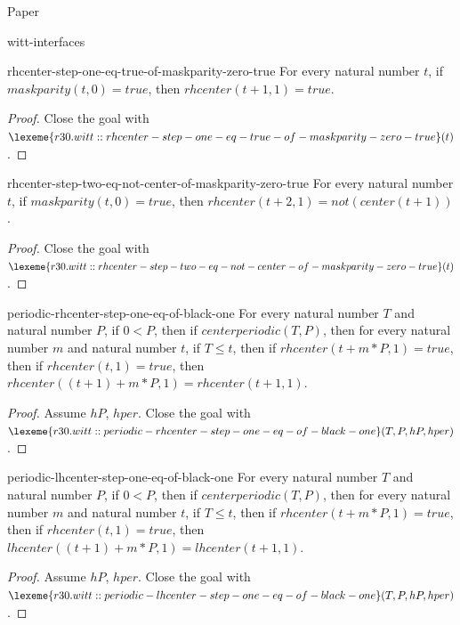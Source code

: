 \begin{lexlean}{Paper}
\begin{section}{witt-interfaces}
  \begin{theorem}{rhcenter-step-one-eq-true-of-maskparity-zero-true}
  For every natural number \(t\), if \(maskparity(t, 0) = true\), then \(rhcenter(t + 1, 1) = true\).
  \begin{proof}
  Close the goal with \(\lexeme{r30.witt::rhcenter-step-one-eq-true-of-maskparity-zero-true}(t)\).
  \end{proof}
  \end{theorem}

  \begin{theorem}{rhcenter-step-two-eq-not-center-of-maskparity-zero-true}
  For every natural number \(t\), if \(maskparity(t, 0) = true\), then \(rhcenter(t + 2, 1) = not(center(t + 1))\).
  \begin{proof}
  Close the goal with \(\lexeme{r30.witt::rhcenter-step-two-eq-not-center-of-maskparity-zero-true}(t)\).
  \end{proof}
  \end{theorem}

  \begin{theorem}{periodic-rhcenter-step-one-eq-of-black-one}
  For every natural number \(T\) and natural number \(P\), if \(0 < P\), then if \(centerperiodic(T, P)\), then for every natural number \(m\) and natural number \(t\), if \(T ≤ t\), then if \(rhcenter(t + m * P, 1) = true\), then if \(rhcenter(t, 1) = true\), then \(rhcenter((t + 1) + m * P, 1) = rhcenter(t + 1, 1)\).
  \begin{proof}
  Assume \(hP\), \(hper\).
  Close the goal with \(\lexeme{r30.witt::periodic-rhcenter-step-one-eq-of-black-one}(T, P, hP, hper)\).
  \end{proof}
  \end{theorem}

  \begin{theorem}{periodic-lhcenter-step-one-eq-of-black-one}
  For every natural number \(T\) and natural number \(P\), if \(0 < P\), then if \(centerperiodic(T, P)\), then for every natural number \(m\) and natural number \(t\), if \(T ≤ t\), then if \(rhcenter(t + m * P, 1) = true\), then if \(rhcenter(t, 1) = true\), then \(lhcenter((t + 1) + m * P, 1) = lhcenter(t + 1, 1)\).
  \begin{proof}
  Assume \(hP\), \(hper\).
  Close the goal with \(\lexeme{r30.witt::periodic-lhcenter-step-one-eq-of-black-one}(T, P, hP, hper)\).
  \end{proof}
  \end{theorem}


\end{section}
\end{lexlean}
